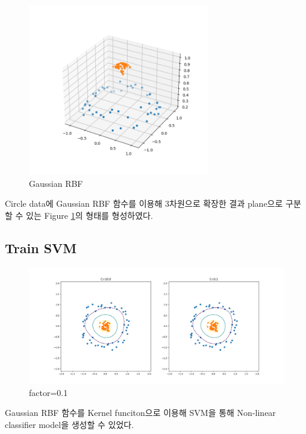 \documentclass[]{report}
\begin{document}
\begin{figure}[ht!]
    \centering
    \includegraphics[width=0.7\textwidth]{image/2-2.png}
    \caption{Gaussian RBF}
    \label{2-2}
\end{figure}

Circle data에 Gaussian RBF 함수를 이용해 3차원으로 확장한 결과
plane으로 구분할 수 있는 Figure \ref{2-2}의 형태를 형성하였다. \\

\subsection{Train SVM}

\begin{figure}[ht!]
    \centering
    \includegraphics[width=1.0\textwidth]{image/2-3.png}
    \caption{factor=0.1}
    \label{2-3}
\end{figure}

Gaussian RBF 함수를 Kernel funciton으로 이용해 SVM을 통해
Non-linear classifier model을 생성할 수 있었다.  \\
\end{document}
